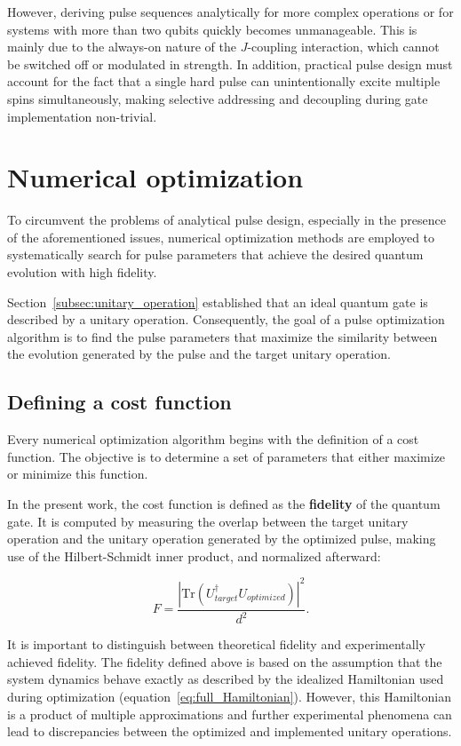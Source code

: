However, deriving pulse sequences analytically for more complex operations or for systems with more than two qubits quickly becomes unmanageable. This is mainly due to the always-on nature of the \(J\)-coupling interaction, which cannot be switched off or modulated in strength. In addition, practical pulse design must account for the fact that a single hard pulse can unintentionally excite multiple spins simultaneously, making selective addressing and decoupling during gate implementation non-trivial.

\section{Numerical optimization}
\label{sec:numerical_optimization}

To circumvent the problems of analytical pulse design, especially in the presence of the aforementioned issues, numerical optimization methods are employed to systematically search for pulse parameters that achieve the desired quantum evolution with high fidelity.

Section~\ref{subsec:unitary_operation} established that an ideal quantum gate is described by a unitary operation. Consequently, the goal of a pulse optimization algorithm is to find the pulse parameters that maximize the similarity between the evolution generated by the pulse and the target unitary operation.

\subsection{Defining a cost function}
\label{subsec:cost_function}

Every numerical optimization algorithm begins with the definition of a cost function. The objective is to determine a set of parameters that either maximize or minimize this function.

In the present work, the cost function is defined as the \textbf{fidelity} of the quantum gate. It is computed by measuring the overlap between the target unitary operation and the unitary operation generated by the optimized pulse, making use of the Hilbert-Schmidt inner product, and normalized afterward:

\begin{equation}
    F = \frac{\left| \mathrm{Tr}(U_{target}^\dagger U_{optimized}) \right|^2}{d^2}.
    \label{eq:normalized_fidelity}
\end{equation}

It is important to distinguish between theoretical fidelity and experimentally achieved fidelity. The fidelity defined above is based on the assumption that the system dynamics behave exactly as described by the idealized Hamiltonian used during optimization (equation~\ref{eq:full_Hamiltonian}). However, this Hamiltonian is a product of multiple approximations and further experimental phenomena can lead to discrepancies between the optimized and implemented unitary operations.

